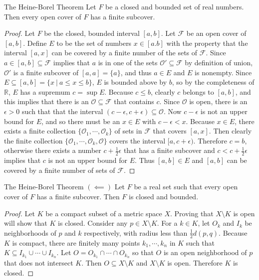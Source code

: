 \begin{namedthm*}{The Heine-Borel Theorem}
Let $F$ be a closed and bounded set of real numbers. Then every open cover of $F$ has a finite subcover. 	
\end{namedthm*}
\begin{proof}
	Let $F$ be the closed, bounded interval $[a,b]$. Let $\mathcal{F}$ be an open cover of $[a,b]$. 
	Define $E$ to be the set of numbers $x \in [a.b]$ with the property that the interval $[a,x]$ can be covered by a finite number of the sets of $\mathcal{F}$.
	Since $a\in [a,b] \subseteq \mathcal{F}$ implies that $a$ is in one of the sets $\mathcal{O}' \subseteq \mathcal{F}$ by definition of union, $\mathcal{O}'$ is a finite subcover of $[a,a]=\{a\}$, and thus $a \in E$ and $E$ is nonempty.
	Since $E \subseteq [a,b] = \{x\ |\ a \le x \le b\}$, $E$ is bounded above by $b$, so by the completeness of $\mathbb{R}$, $E$ has a supremum $c = \sup E$.
	Because $c \le b$, clearly $c$ belongs to $[a,b]$, and this implies that there is an $\mathcal{O} \subseteq \mathcal{F}$ that contains $c$.
	Since $\mathcal{O}$ is open, there is an $\epsilon >0$ such that that the interval $(c- \epsilon, c+ \epsilon) \subseteq \mathcal{O}$.
	Now $c-\epsilon$ is not an upper bound for $E$, and so there must be an $x \in E$ with $c-\epsilon < x$. Because $x \in E$, there exists a finite collection $\{ \mathcal{O}_1, \cdots, \mathcal{O}_k \}$ of sets in $\mathcal{F}$ that covers $[a,x]$.
	Then clearly the finite collection $\{ \mathcal{O}_1, \cdots, \mathcal{O}_k, \mathcal{O} \}$ covers the interval $[a,c+ \epsilon)$.
	Therefore $c=b$, otherwise there exists a number $c +\tfrac{1}{2}\epsilon$ that has a finite subcover and $c < c +\tfrac{1}{2}\epsilon$ implies that $c$ is not an upper bound for $E$.
	Thus $[a,b] \in E$ and $[a,b]$ can be covered by a finite number of sets of $\mathcal{F}$.
\end{proof}

\begin{namedthm*}{The Heine-Borel Theorem $(\impliedby)$}
	Let $F$ be a real set such that every open cover of $F$ has a finite subcover. Then $F$ is closed and bounded.
\end{namedthm*}
\begin{proof}
	Let $K$ be a compact subset of a metric space $X$. Proving that $X \setminus K$ is open will show that $K$ is closed.
	Consider any $p \in X \setminus K$. For a $k \in K$, let $O_k$ and $I_k$ be neighborhoods of $p$ and $k$ respectively, with radius less than $\tfrac{1}{2} d(p,q)$.
	Because $K$ is compact, there are finitely many points $k_1, \cdots, k_n$ in $K$ such that $K \subseteq I_{k_1} \cup \cdots \cup I_{k_n}$.
	Let $O = O_{k_1} \cap \cdots \cap O_{k_n}$ so that $O$ is an open neighborhood of $p$ that does not intersect $K$.
	Then $O \subseteq X \setminus K$ and $X\setminus K$ is open. Therefore $K$ is closed. 
\end{proof}

